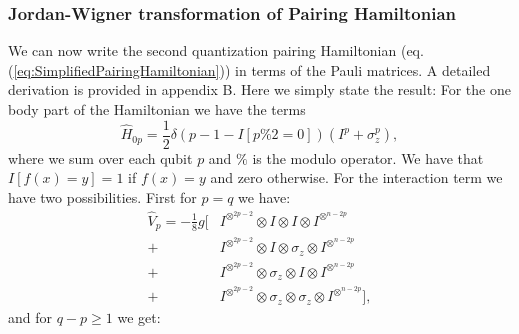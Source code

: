 \subsubsection{Jordan-Wigner transformation of Pairing Hamiltonian}
\label{subsubsec:JordanWignerPairing}
We can now write the second quantization pairing Hamiltonian (eq. (\ref{eq:SimplifiedPairingHamiltonian})) in terms of the Pauli matrices. A detailed derivation is provided in appendix B. Here we simply state the result: For the one body part of the Hamiltonian we have the terms
\begin{equation}
    \label{eq:Onebodyintermsofpauli}
    \hat{H}_{0p} = \frac{1}{2}\delta(p - 1 - I[p\%2=0])(I^p + \sigma_z^p),
\end{equation}
where we sum over each qubit $p$ and $\%$ is the modulo operator. We have that $I[f(x) = y] = 1$ if $f(x) = y$ and zero otherwise. For the interaction term we have two possibilities. First for $p = q$ we have:
\begin{align}
    \label{eq:twobodypaulipisq}
    \hat{V}_{p} = -\frac{1}{8}g\Big[ &I^{\otimes^{2p-2}} \otimes I  \otimes I \otimes I^{\otimes^{n - 2p}} \nonumber \\
    +& I^{\otimes^{2p-2}} \otimes I  \otimes \sigma_z \otimes I^{\otimes^{n - 2p}} \\
    +& I^{\otimes^{2p-2}} \otimes \sigma_z  \otimes I \otimes I^{\otimes^{n - 2p}} \nonumber \\
    +& I^{\otimes^{2p-2}} \otimes \sigma_z  \otimes \sigma_z \otimes I^{\otimes^{n - 2p}}\Big],\nonumber 
\end{align}
and for $q - p \geq 1$ we get:
